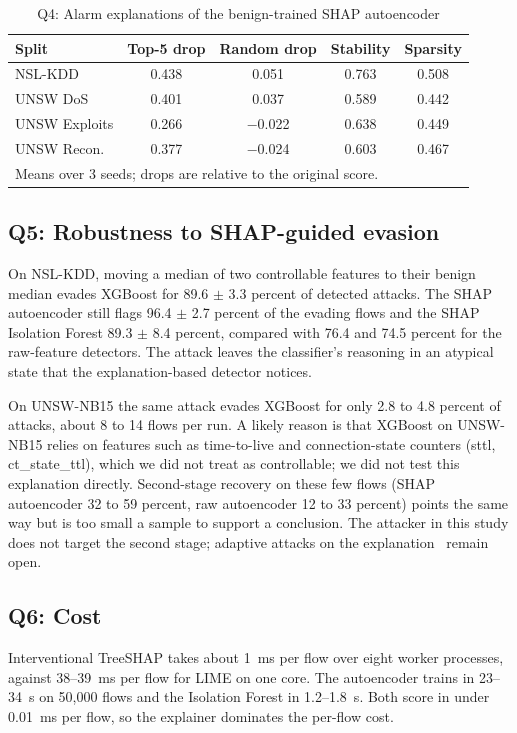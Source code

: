 \documentclass[conference]{IEEEtran}
\begin{document}
\begin{table}[t]
\caption{Q4: Alarm explanations of the benign-trained SHAP autoencoder}
\label{tab:q4}
\centering
\begin{tabular}{lcccc}
\toprule
Split & Top-5 drop & Random drop & Stability & Sparsity \\
\midrule
NSL-KDD & 0.438 & 0.051 & 0.763 & 0.508 \\
UNSW DoS & 0.401 & 0.037 & 0.589 & 0.442 \\
UNSW Exploits & 0.266 & $-$0.022 & 0.638 & 0.449 \\
UNSW Recon. & 0.377 & $-$0.024 & 0.603 & 0.467 \\
\bottomrule
\multicolumn{5}{l}{\footnotesize Means over 3 seeds; drops are relative to the original score.}
\end{tabular}
\end{table}

\subsection{Q5: Robustness to SHAP-guided evasion}
On NSL-KDD, moving a median of two controllable features to their benign median evades XGBoost for 89.6 $\pm$ 3.3 percent of detected attacks. The SHAP autoencoder still flags 96.4 $\pm$ 2.7 percent of the evading flows and the SHAP Isolation Forest 89.3 $\pm$ 8.4 percent, compared with 76.4 and 74.5 percent for the raw-feature detectors. The attack leaves the classifier's reasoning in an atypical state that the explanation-based detector notices.

On UNSW-NB15 the same attack evades XGBoost for only 2.8 to 4.8 percent of attacks, about 8 to 14 flows per run. A likely reason is that XGBoost on UNSW-NB15 relies on features such as time-to-live and connection-state counters (sttl, ct\_state\_ttl), which we did not treat as controllable; we did not test this explanation directly. Second-stage recovery on these few flows (SHAP autoencoder 32 to 59 percent, raw autoencoder 12 to 33 percent) points the same way but is too small a sample to support a conclusion. The attacker in this study does not target the second stage; adaptive attacks on the explanation~\cite{slack2020fooling} remain open.

\subsection{Q6: Cost}
Interventional TreeSHAP takes about 1~ms per flow over eight worker processes, against 38--39~ms per flow for LIME on one core. The autoencoder trains in 23--34~s on 50,000 flows and the Isolation Forest in 1.2--1.8~s. Both score in under 0.01~ms per flow, so the explainer dominates the per-flow cost.
\end{document}
